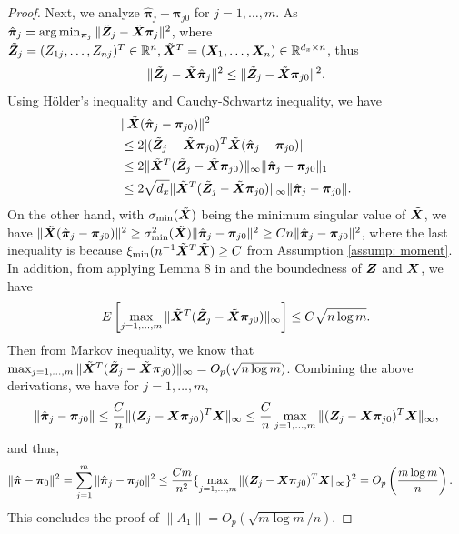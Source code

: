 \documentclass[12pt]{article}
\begin{document}
{\begin{proof}
 Next, we analyze $ 		\hat{\bm\pi}_j-\bm \pi_{j0}  $
 for $ j=1,\dots, m $. As $ 	\hat{\bm\pi}_j = \arg\min_{\bm \pi_j } \| \tilde {\bm{Z}}_j - \tilde{\bm X} \bm\pi_j \|^2 $, where $  \tilde {\bm{Z}}_j = (Z_{1j}, \dots, Z_{nj})^T \in \mathbb{R}^n, \tilde{\bm{X}}^T = (\bm{X}_1,\dots,\bm{X}_n )  \in \mathbb{R}^{ d_x\times n} $, thus 
\begin{align*}
 \|\tilde {\bm{Z}}_j - \tilde{\bm X} \hat{\bm\pi}_j \|^2  \leq  \| \tilde {\bm{Z}}_j - \tilde{\bm X} {\bm\pi}_{j0}\|^2.
\end{align*} 
Using H\"{o}lder's inequality and Cauchy-Schwartz inequality, we have 
\begin{align}
&\|\tilde{\bm{X}} (\hat{\bm \pi}_j -{\bm \pi}_{j0} )\|^2 \nonumber\\
&\leq  2|(\tilde {\bm{Z}}_j - \tilde{\bm{X}} \bm\pi_{j0})^T \tilde{\bm{X}}(\hat{\bm\pi}_j - \bm\pi_{j0}) | \nonumber \\
&\leq  2\| \tilde{\bm{X}}^T (\tilde{\bm{Z}}_j -\tilde {\bm{X}} \bm\pi_{j0})\|_{\infty} \|\hat{\bm\pi}_j - \bm\pi_{j0} \|_1 \nonumber \\
&\leq 2\sqrt{d_x}\| \tilde {\bm{X}}^T (\tilde{\bm{Z}}_j -\tilde {\bm{X}} \bm\pi_{j0})\|_{\infty} \|\hat{\bm\pi}_j - \bm\pi_{j0} \|.  \label{eq: pi}
\end{align} 
On the other hand, with $ \sigma_{\min}(\tilde {\bm{X}}) $ being the minimum singular value of $\tilde{\bm{X}} $, we have 
 $ \|\tilde {\bm{X}} (\hat{\bm \pi}_j -{\bm \pi}_{j0} )\|^2  \geq \sigma^2_{\min} (\tilde{\bm{X}}) \| \hat{\bm \pi}_j -{\bm \pi}_{j0} \|^2\geq Cn  \| \hat{\bm \pi}_j -{\bm \pi}_{j0} \|^2$, where the last inequality is because $ \xi_{\min} (n^{-1}\tilde {\bm{X}}^T \tilde {\bm{X}}) \geq C$  from Assumption \ref{assump: moment}. In addition, from applying Lemma 8 in \cite{chernozhukov2015comparison} and  the boundedness of $ \bm{Z} $ and $ \bm{X} $, we have 
 \begin{align*}
E\left[ \max_{j=1,\dots, m}  \| \tilde {\bm{X}}^T (\tilde {\bm{Z}}_j - \tilde {\bm{X}} \bm \pi_{j0} ) \|_{\infty}  \right] \leq C  \sqrt{n \log m}.
 \end{align*}
 Then from Markov inequality, we know that  $ \max_{j=1,\dots, m} \| \tilde {\bm{X}}^T (\tilde {\bm{Z}}_j - \tilde {\bm{X}} \bm \pi_{j0} ) \|_{\infty}= O_p( \sqrt{n \log m} )$.  Combining the above derivations, 
we have for $ j=1,\dots, m $, 
\begin{align*}
	\|\hat{\bm \pi}_j -{\bm \pi}_{j0} \|  \leq \frac{C }{n } \| (\bm Z_j - \bm{X} \bm \pi_{j0} )^T \bm X \|_{\infty}   \leq  \frac{C }{n } \max_{j=1,\dots, m}  \| (\bm Z_j - \bm{X} \bm \pi_{j0} )^T \bm X \|_{\infty},
\end{align*}
and thus, 
\begin{align*}
&\|	 \hat{\bm \pi} - \bm \pi_0\|^2= \sum_{j=1}^{m}	\|\hat{\bm \pi}_j -{\bm \pi}_{j0} \|^2  \leq  \frac{Cm}{n^2} \{\max_{j=1,\dots,m } \| (\bm Z_j - \bm{X} \bm \pi_{j0} )^T \bm X \|_{\infty} \}^2 = O_p\left(  \frac{m\log m}{n}  \right). 
\end{align*}
This concludes the proof of $ \|A_1\| = O_p (\sqrt{m\log m}/n ) $. 



\end{proof}}
\end{document}
